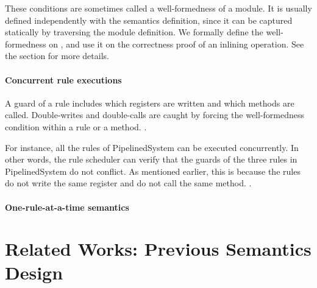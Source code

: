 These conditions are sometimes called a well-formedness of a
module. It is usually defined independently with the semantics
definition, since it can be captured statically by traversing the
module definition. We formally define the well-formedness on
, and use it on the correctness proof of an inlining
operation. See the section for more details.

\paragraph{Concurrent rule executions}

A guard of a rule includes which registers are written and which
methods are called. Double-writes and double-calls are caught by
forcing the well-formedness condition within a rule or a
method. .

For instance, all the rules of PipelinedSystem can be executed
concurrently. In other words, the rule scheduler can verify that the
guards of the three rules in PipelinedSystem do not conflict. As
mentioned earlier, this is because the rules do not write the same
register and do not call the same method. .

\paragraph{One-rule-at-a-time semantics}

\section{Related Works: Previous Semantics Design}
\label{sec:related-works}




